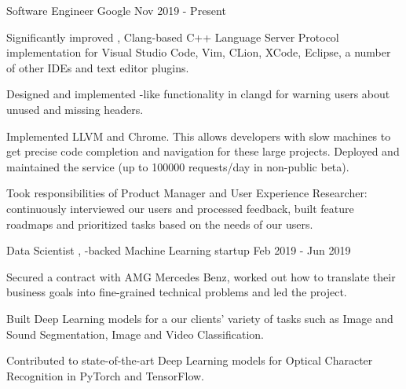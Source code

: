 
\begin{cventries}

  \cventry
    {Software Engineer}
    {Google}
    {}
    {Nov 2019 - Present}
    {
      \begin{cvitems}
        \item Significantly improved ,
          Clang-based C++ Language Server Protocol implementation for Visual
          Studio Code, Vim, CLion, XCode, Eclipse, a number of other IDEs and
          text editor plugins.
        \item Designed and implemented
          -like functionality in
          clangd for warning users about unused and missing headers.
        \item Implemented 
          LLVM and Chrome. This allows developers with slow machines to get
          precise code completion and navigation for these large projects.
          Deployed and maintained the service (up to 100000 requests/day in
          non-public beta).
        \item Took responsibilities of Product Manager and User Experience
          Researcher: continuously interviewed our users and processed feedback,
          built feature roadmaps and prioritized tasks based on the needs of our
          users.
      \end{cvitems}
    }

  \cventry
    {Data Scientist}
    {,
     -backed Machine Learning
     startup}
    {}
    {Feb 2019 - Jun 2019}
    {
      \begin{cvitems}
        \item Secured a contract with AMG Mercedes Benz, worked out how to
          translate their business goals into fine-grained technical problems
          and led the project.
        \item Built Deep Learning models for a our clients' variety of tasks
          such as Image and Sound Segmentation, Image and Video Classification.
        \item Contributed to state-of-the-art Deep Learning models for Optical
          Character Recognition in PyTorch and TensorFlow.
      \end{cvitems}
    }


\end{cventries}
